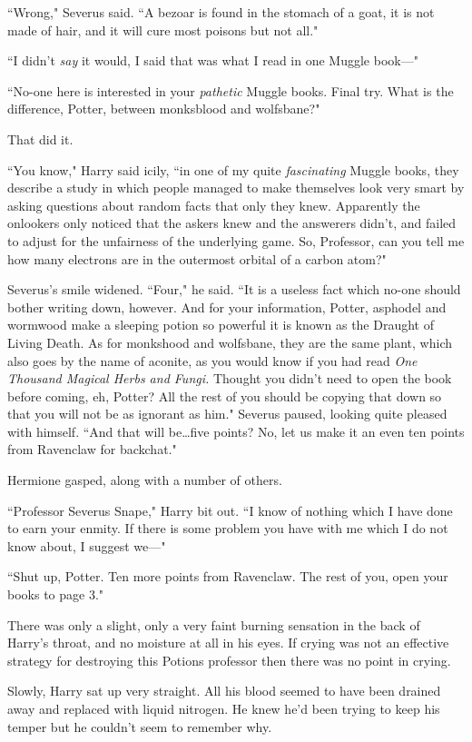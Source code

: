 ``Wrong," Severus said. ``A bezoar is found in the stomach of a goat, it is not made of hair, and it will cure most poisons but not all."

``I didn't \emph{say} it would, I said that was what I read in one Muggle book—"

``No-one here is interested in your \emph{pathetic} Muggle books. Final try. What is the difference, Potter, between monksblood and wolfsbane?"

That did it.

``You know," Harry said icily, ``in one of my quite \emph{fascinating} Muggle books, they describe a study in which people managed to make themselves look very smart by asking questions about random facts that only they knew. Apparently the onlookers only noticed that the askers knew and the answerers didn't, and failed to adjust for the unfairness of the underlying game. So, Professor, can you tell me how many electrons are in the outermost orbital of a carbon atom?"

Severus's smile widened. ``Four," he said. ``It is a useless fact which no-one should bother writing down, however. And for your information, Potter, asphodel and wormwood make a sleeping potion so powerful it is known as the Draught of Living Death. As for monkshood and wolfsbane, they are the same plant, which also goes by the name of aconite, as you would know if you had read \emph{One Thousand Magical Herbs and Fungi.} Thought you didn't need to open the book before coming, eh, Potter? All the rest of you should be copying that down so that you will not be as ignorant as him." Severus paused, looking quite pleased with himself. ``And that will be…five points? No, let us make it an even ten points from Ravenclaw for backchat."

Hermione gasped, along with a number of others.

``Professor Severus Snape," Harry bit out. ``I know of nothing which I have done to earn your enmity. If there is some problem you have with me which I do not know about, I suggest we—"

``Shut up, Potter. Ten more points from Ravenclaw. The rest of you, open your books to page 3."

There was only a slight, only a very faint burning sensation in the back of Harry's throat, and no moisture at all in his eyes. If crying was not an effective strategy for destroying this Potions professor then there was no point in crying.

Slowly, Harry sat up very straight. All his blood seemed to have been drained away and replaced with liquid nitrogen. He knew he'd been trying to keep his temper but he couldn't seem to remember why.

